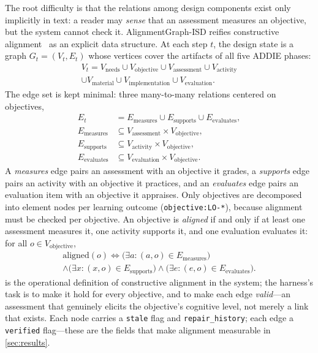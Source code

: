 The root difficulty is that the relations among design components exist only
implicitly in text: a reader may \emph{sense} that an assessment measures an
objective, but the system cannot check it. AlignmentGraph-ISD reifies constructive
alignment~\cite{biggs1996enhancing} as an explicit data structure. At each step
$t$, the design state is a graph $G_t = (V_t, E_t)$ whose vertices cover the
artifacts of all five ADDIE phases:
\begin{multline*}
V_t = V_{\mathrm{needs}} \cup V_{\mathrm{objective}} \cup V_{\mathrm{assessment}} \cup V_{\mathrm{activity}} \\
 \cup V_{\mathrm{material}} \cup V_{\mathrm{implementation}} \cup V_{\mathrm{evaluation}}.
\end{multline*}
The edge set is kept minimal: three many-to-many relations centered on objectives,
\begin{align*}
E_t &= E_{\mathrm{measures}} \cup E_{\mathrm{supports}} \cup E_{\mathrm{evaluates}},\\
E_{\mathrm{measures}} &\subseteq V_{\mathrm{assessment}} \times V_{\mathrm{objective}},\\
E_{\mathrm{supports}} &\subseteq V_{\mathrm{activity}} \times V_{\mathrm{objective}},\\
E_{\mathrm{evaluates}} &\subseteq V_{\mathrm{evaluation}} \times V_{\mathrm{objective}}.
\end{align*}
A \textsl{measures} edge pairs an assessment with an objective it grades, a
\textsl{supports} edge pairs an activity with an objective it practices, and an
\textsl{evaluates} edge pairs an evaluation item with an objective it appraises.
Only objectives are decomposed into element nodes per learning outcome
(\texttt{objective:LO-*}), because alignment must be checked per objective. An
objective is \emph{aligned} if and only if at least one assessment measures it, one
activity supports it, and one evaluation evaluates it: for all $o \in V_{\mathrm{objective}}$,
\begin{multline}
\label{eq:aligned}
\mathrm{aligned}(o) \iff \big(\exists a\colon (a,o) \in E_{\mathrm{measures}}\big) \\
 \wedge \big(\exists x\colon (x,o) \in E_{\mathrm{supports}}\big) \wedge \big(\exists e\colon (e,o) \in E_{\mathrm{evaluates}}\big).
\end{multline}
 is the operational definition of constructive alignment in the
system; the harness's task is to make it hold for every objective, and to make
each edge \emph{valid}---an assessment that genuinely elicits the objective's
cognitive level, not merely a link that exists. Each node carries a \texttt{stale}
flag and \texttt{repair\_history}; each edge a \texttt{verified} flag---these are
the fields that make alignment measurable in \cref{sec:results}.

